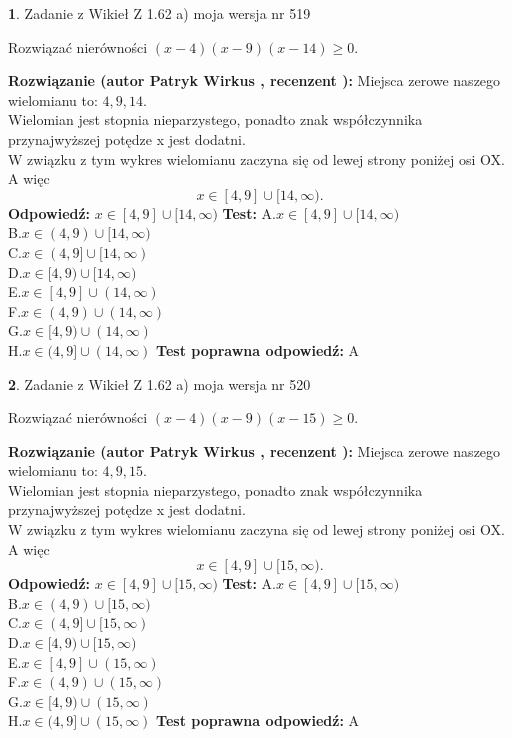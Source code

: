 \documentclass[12pt, a4paper]{article}
\theoremstyle{definition} %
\newtheorem{zad}{}
\newcommand{\zadStart}[1]{\begin{zad}#1\newline}
\newcommand{\zadStop}{\end{zad}}
\newcommand{\rozwStart}[2]{\noindent \textbf{Rozwiązanie (autor #1 , recenzent #2): }\newline}
\newcommand{\rozwStop}{\newline}
\newcommand{\odpStart}{\noindent \textbf{Odpowiedź:}\newline}
\newcommand{\odpStop}{\newline}
\newcommand{\testStart}{\noindent \textbf{Test:}\newline}
\newcommand{\testStop}{\newline}
\newcommand{\kluczStart}{\noindent \textbf{Test poprawna odpowiedź:}\newline}
\newcommand{\kluczStop}{\newline}
\begin{document}
\zadStart{Zadanie z Wikieł Z 1.62 a) moja wersja nr 519}

Rozwiązać nierówności $(x-4)(x-9)(x-14)\ge0$.
\zadStop
\rozwStart{Patryk Wirkus}{}
Miejsca zerowe naszego wielomianu to: $4, 9, 14$.\\
Wielomian jest stopnia nieparzystego, ponadto znak współczynnika przy\linebreak najwyższej potędze x jest dodatni.\\ W związku z tym wykres wielomianu zaczyna się od lewej strony poniżej osi OX. A więc $$x \in [4,9] \cup [14,\infty).$$
\rozwStop
\odpStart
$x \in [4,9] \cup [14,\infty)$
\odpStop
\testStart
A.$x \in [4,9] \cup [14,\infty)$\\
B.$x \in (4,9) \cup [14,\infty)$\\
C.$x \in (4,9] \cup [14,\infty)$\\
D.$x \in [4,9) \cup [14,\infty)$\\
E.$x \in [4,9] \cup (14,\infty)$\\
F.$x \in (4,9) \cup (14,\infty)$\\
G.$x \in [4,9) \cup (14,\infty)$\\
H.$x \in (4,9] \cup (14,\infty)$
\testStop
\kluczStart
A
\kluczStop



\zadStart{Zadanie z Wikieł Z 1.62 a) moja wersja nr 520}

Rozwiązać nierówności $(x-4)(x-9)(x-15)\ge0$.
\zadStop
\rozwStart{Patryk Wirkus}{}
Miejsca zerowe naszego wielomianu to: $4, 9, 15$.\\
Wielomian jest stopnia nieparzystego, ponadto znak współczynnika przy\linebreak najwyższej potędze x jest dodatni.\\ W związku z tym wykres wielomianu zaczyna się od lewej strony poniżej osi OX. A więc $$x \in [4,9] \cup [15,\infty).$$
\rozwStop
\odpStart
$x \in [4,9] \cup [15,\infty)$
\odpStop
\testStart
A.$x \in [4,9] \cup [15,\infty)$\\
B.$x \in (4,9) \cup [15,\infty)$\\
C.$x \in (4,9] \cup [15,\infty)$\\
D.$x \in [4,9) \cup [15,\infty)$\\
E.$x \in [4,9] \cup (15,\infty)$\\
F.$x \in (4,9) \cup (15,\infty)$\\
G.$x \in [4,9) \cup (15,\infty)$\\
H.$x \in (4,9] \cup (15,\infty)$
\testStop
\kluczStart
A
\kluczStop
\end{document}
